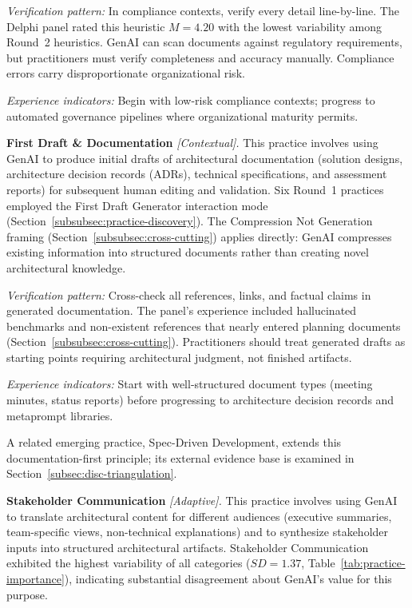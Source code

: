 \textit{Verification pattern:} In compliance contexts, verify every detail
line-by-line. The Delphi panel rated this heuristic $M = 4.20$ with the lowest
variability among Round~2 heuristics. GenAI can scan documents against regulatory
requirements, but practitioners must verify completeness and accuracy manually.
Compliance errors carry disproportionate organizational risk.

\textit{Experience indicators:} Begin with low-risk compliance contexts;
progress to automated governance pipelines where organizational maturity
permits.

\textbf{First Draft \& Documentation} \textit{[Contextual].}
This practice involves using GenAI to produce initial drafts of architectural
documentation (solution designs, architecture decision records (ADRs),
technical specifications, and assessment reports) for subsequent human editing
and validation. Six Round~1 practices employed the First Draft Generator
interaction mode (Section~\ref{subsubsec:practice-discovery}). The Compression
Not Generation framing (Section~\ref{subsubsec:cross-cutting}) applies directly:
GenAI compresses existing information into structured documents rather than
creating novel architectural knowledge.

\textit{Verification pattern:} Cross-check all references, links, and factual
claims in generated documentation. The panel's experience included hallucinated
benchmarks and non-existent references that nearly entered planning documents
(Section~\ref{subsubsec:cross-cutting}). Practitioners should treat generated
drafts as starting points requiring architectural judgment, not finished
artifacts.

\textit{Experience indicators:} Start with well-structured document types
(meeting minutes, status reports) before progressing to architecture decision
records and metaprompt libraries.

A related emerging practice, Spec-Driven Development, extends this
documentation-first principle; its external evidence base is examined in
Section~\ref{subsec:disc-triangulation}.

\textbf{Stakeholder Communication} \textit{[Adaptive].}
This practice involves using GenAI to translate architectural content for
different audiences (executive summaries, team-specific views, non-technical
explanations) and to synthesize stakeholder inputs into structured architectural
artifacts. Stakeholder Communication exhibited the highest variability of all
categories ($SD = 1.37$, Table~\ref{tab:practice-importance}), indicating
substantial disagreement about GenAI's value for this purpose.

